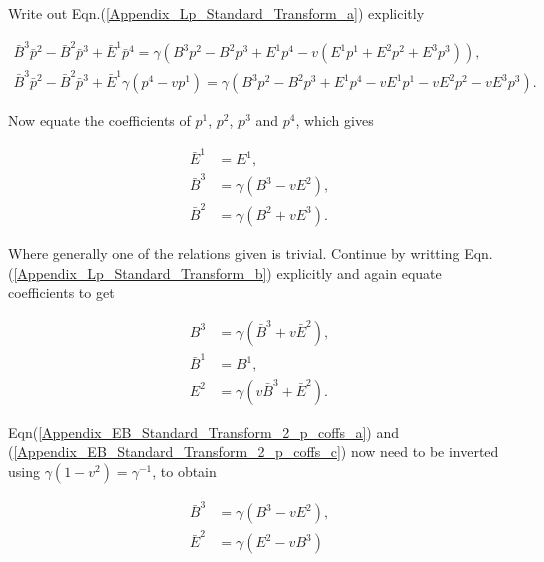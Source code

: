 \begin{appendix}
\noindent Write out Eqn.(\ref{Appendix_Lp_Standard_Transform_a}) explicitly

\begin{gather*}
\bar{B}^3 \bar{p}^2 - \bar{B}^2 \bar{p}^3 + \bar{E}^1 \bar{p}^4 = \gamma(B^3p^2 - B^2 p^3 + E^1p^4 - v(E^1p^1 + E^2 p^2 + E^3p^3)),\\
\bar{B}^3 \bar{p}^2 - \bar{B}^2 \bar{p}^3 + \bar{E}^1 \gamma(p^4 - vp^1) = \gamma(B^3p^2 - B^2 p^3 + E^1p^4 - vE^1p^1 -v E^2 p^2 -v E^3p^3).
\end{gather*}

\noindent Now equate the coefficients of $p^1$, $p^2$, $p^3$ and $p^4$, which gives

\begin{subequations}
\begin{align}
\label{Appendix_EB_Standard_Transform_1_p_coffs_a}
\bar{E}^1 & = E^1,
\\\label{Appendix_EB_Standard_Transform_1_p_coffs_b}
\bar{B}^3 & = \gamma(B^3 - vE^2),
\\\label{Appendix_EB_Standard_Transform_1_p_coffs_b}
\bar{B}^2 & = \gamma(B^2 + vE^3).
\end{align}
\end{subequations}

\noindent Where generally one of the relations given is trivial. Continue by writting Eqn.(\ref{Appendix_Lp_Standard_Transform_b}) explicitly and again equate coefficients to get

\begin{align}
\label{Appendix_EB_Standard_Transform_2_p_coffs_a}
B^3 & = \gamma (\bar{B}^3 + v \bar{E}^2),
\\\label{Appendix_EB_Standard_Transform_2_p_coffs_b}
\bar{B}^1 & = {B}^1,
\\\label{Appendix_EB_Standard_Transform_2_p_coffs_c}
E^2 & = \gamma(v\bar{B}^3 + \bar{E}^2).
\end{align}

\noindent Eqn(\ref{Appendix_EB_Standard_Transform_2_p_coffs_a}) and (\ref{Appendix_EB_Standard_Transform_2_p_coffs_c}) now need to be inverted using $\gamma (1-v^2) = \gamma^{-1}$, to obtain

\begin{subequations}
\begin{align}
\label{Appendix_EB_Standard_Transform_2_p_coeffs_Inverted_a}
\bar{B}^3 & = \gamma (B^3 - vE^2),
\\\label{Appendix_EB_Standard_Transform_2_p_coeffs_Inverted_b}
\bar{E}^2 & = \gamma (E^2 - vB^3)
\end{align}
\end{subequations}


\end{appendix}
